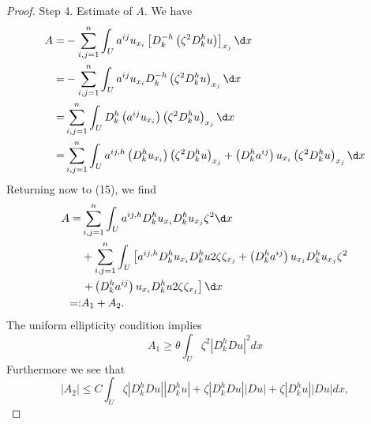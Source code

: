 \begin{theorem}
\begin{proof}
        Step 4. Estimate of $A$. We have
        \begin{equation*}
            \begin{aligned}
                A= & -\sum_{i, j=1}^n \int_U a^{i j} u_{x_i}\left[D_k^{-h}\left(\zeta^2 D_k^h u\right)\right]_{x_j} \d x                                                                      \\
                =  & -\sum_{i, j=1}^n \int_U a^{i j} u_{x_i}
                D_k^{-h}\left(\zeta^2 D_k^h u\right)_{x_j} \d x                                                                                                                               \\
                =  & \sum_{i, j=1}^n \int_U D_k^h\left(a^{i j} u_{x_i}\right)\left(\zeta^2 D_k^h u\right)_{x_j} \d x                                                                          \\
                =  & \sum_{i, j=1}^n \int_U a^{i j, h}\left(D_k^h u_{x_i}\right)\left(\zeta^2 D_k^h u\right)_{x_j} +\left(D_k^h a^{i j}\right) u_{x_i}\left(\zeta^2 D_k^h u\right)_{x_j} \d x
            \end{aligned}
        \end{equation*}
        Returning now to (15), we find
        \begin{equation*}
            \begin{aligned}
                A= & \sum_{i, j=1}^n \int_U a^{i j, h} D_k^h u_{x_i} D_k^h u_{x_j} \zeta^2 \d x                                                                        \\
                   & +\sum_{i, j=1}^n \int_U\left[a^{i j, h} D_k^h u_{x_i} D_k^h u 2 \zeta \zeta_{x_j}+\left(D_k^h a^{i j}\right) u_{x_i} D_k^h u_{x_j} \zeta^2\right. \\
                   & \left.+\left(D_k^h a^{i j}\right) u_{x_i} D_k^h u 2 \zeta \zeta_{x_j}\right] \d x                                                                 \\
                =: & A_1+A_2 .
            \end{aligned}
        \end{equation*}
        The uniform ellipticity condition implies
        \begin{equation}
            A_1 \geq \theta \int_U \zeta^2\left|D_k^h D u\right|^2 d x
        \end{equation}
        Furthermore we see that
        \begin{equation*}
            \left|A_2\right| \leq C \int_U \zeta\left|D_k^h D u\right|\left|D_k^h u\right|+\zeta\left|D_k^h D u\right||D u|+\zeta\left|D_k^h u\right||D u| d x,

\end{equation*}
\end{proof}
\end{theorem}
